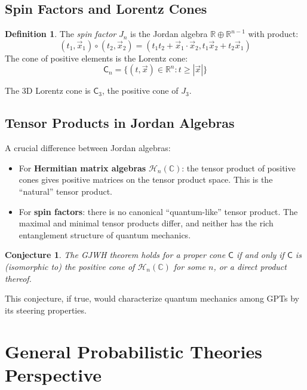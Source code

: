 \documentclass[11pt,a4paper]{article}
\newtheorem{conjecture}[theorem]{Conjecture}
\theoremstyle{definition}
\newtheorem{definition}[theorem]{Definition}
\newcommand{\C}{\mathsf{C}}
\newcommand{\R}{\mathbb{R}}
\newcommand{\Complex}{\mathbb{C}}
\begin{document}
\subsection{Spin Factors and Lorentz Cones}

\begin{definition}
The \emph{spin factor} $J_n$ is the Jordan algebra $\R \oplus \R^{n-1}$ with product:
\[
(t_1, \vec{x}_1) \circ (t_2, \vec{x}_2) = (t_1 t_2 + \vec{x}_1 \cdot \vec{x}_2, t_1 \vec{x}_2 + t_2 \vec{x}_1)
\]
The cone of positive elements is the Lorentz cone:
\[
\C_n = \{(t, \vec{x}) \in \R^n : t \geq |\vec{x}|\}
\]
\end{definition}

The 3D Lorentz cone is $\C_3$, the positive cone of $J_3$.

\subsection{Tensor Products in Jordan Algebras}

A crucial difference between Jordan algebras:

\begin{itemize}
    \item For \textbf{Hermitian matrix algebras} $\mathcal{H}_n(\Complex)$: the tensor product of positive cones gives positive matrices on the tensor product space. This is the ``natural'' tensor product.

    \item For \textbf{spin factors}: there is no canonical ``quantum-like'' tensor product. The maximal and minimal tensor products differ, and neither has the rich entanglement structure of quantum mechanics.
\end{itemize}

\begin{conjecture}
The GJWH theorem holds for a proper cone $\C$ if and only if $\C$ is (isomorphic to) the positive cone of $\mathcal{H}_n(\Complex)$ for some $n$, or a direct product thereof.
\end{conjecture}

This conjecture, if true, would characterize quantum mechanics among GPTs by its steering properties.

\section{General Probabilistic Theories Perspective}
\end{document}
